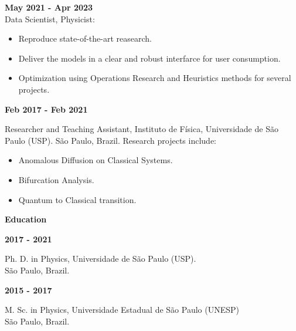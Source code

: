 \documentclass[a4paper,12pt,final]{memoir}
\newcommand{\SmallSep}{\vspace{0.5em}}
\newcommand{\CVSection}[1]
	{\Large\textbf{#1}\par
	\SmallSep\normalsize\normalfont}
\newcommand{\CVItem}[1]
	{\textbf{\color{RoyalBlue} #1}}
\begin{document}
\CVItem{May 2021 - Apr 2023}\\
{\small Data Scientist, Physicist:}
\begin{footnotesize}
\begin{itemize}
\item Reproduce state-of-the-art reasearch.
\item Deliver the models in a clear and robust interfarce for user consumption.
\item Optimization using Operations Research and Heuristics methods for several projects.
\end{itemize}
\end{footnotesize}
\SmallSep

\CVItem{Feb 2017 - Feb 2021}\\
\begin{small}
Researcher and Teaching Assistant,  Instituto de F\'{i}sica, Universidade de S\~{a}o Paulo 
(USP). S\~{a}o Paulo, Brazil. 
Research projects include: 
\end{small}
\begin{footnotesize}
\begin{itemize}
\item Anomalous Diffusion on Classical Systems.
\item Bifurcation Analysis.
\item Quantum to Classical transition.
\end{itemize}
\end{footnotesize}

\SmallSep



\SmallSep

\CVSection{Education}
\CVItem{2017 - 2021}\\
\begin{small}
 Ph. D. in Physics, Universidade de S\~{a}o Paulo (USP).\\ 
S\~{a}o Paulo, Brazil.
 \end{small} 
\SmallSep

\CVItem{2015 - 2017}\\
\begin{small}
M. Sc. in Physics, Universidade Estadual de S\~{a}o Paulo (UNESP)\\
S\~{a}o Paulo, Brazil.
\end{small}
\SmallSep
\end{document}
